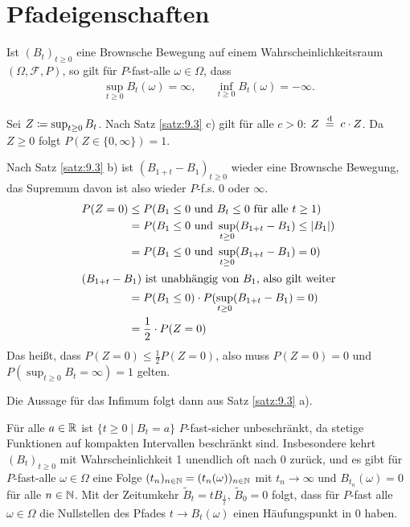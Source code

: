 \documentclass[a4paper,twoside,DIV15,BCOR12mm]{scrbook}
\newcommand{\cF}{\mathcal F}
\begin{document}
\section{Pfadeigenschaften}

\begin{satz}
\label{satz:11.1}
Ist $(B_t)_{t\ge 0}$ eine Brownsche Bewegung auf einem Wahrscheinlichkeitsraum $(\Omega, \cF, P)$, so gilt für $P$-fast-alle $\omega\in \Omega$, dass 
\begin{align*}
\sup_{t\ge 0} B_t(\omega) = \infty, &&\inf_{t\ge 0}B_t(\omega)=-\infty.
\end{align*}
\end{satz}
\begin{beweis}
Sei $Z\da \sup_{t\ge 0}B_t$. Nach Satz \ref{satz:9.3} c) gilt für alle $c>0$:
$Z\gleichnach{d} c\cdot Z$. Da $Z\ge 0$ folgt $P(Z \in \{0,\infty\})=1$.

Nach Satz \ref{satz:9.3} b) ist $(B_{1+t}-B_1)_{t\ge 0}$ wieder eine Brownsche Bewegung, das Supremum davon ist also wieder $P$-f.s. $0$ oder $\infty$.
\begin{align*}
P(Z=0) &\le P(B_1\le 0\text{ und }B_t\le 0\text{ für alle } t\ge 1) \\
&=P(B_1\le 0 \text{ und } \sup_{t\ge 0}(B_{1+t}-B_1) \le |B_1|) \\
&= P(B_1 \le 0 \text{ und } \sup_{t\ge 0}(B_{1+t}-B_1) = 0) \\
\intertext{$(B_{1+t}-B_1)$ ist unabhängig von $B_1$, also gilt weiter}
&= P(B_1\le 0)\cdot P(\sup_{t\ge 0}(B_{1+t}-B_1) = 0) \\
&= \frac12 \cdot P(Z=0)
\end{align*}
Das heißt, dass $P(Z=0)\le \frac 12 P(Z=0)$, also muss $P(Z=0)=0$ und $P(\sup_{t\ge 0}B_t =\infty) = 1$ gelten.

Die Aussage für das Infimum folgt dann aus Satz \ref{satz:9.3} a).
\end{beweis}


\begin{bemerkung}
Für alle $a\in \mathbb{R}$ ist $\{t\ge 0\mid B_t=a\}$ $P$-fast-sicher unbeschränkt, da stetige Funktionen auf kompakten Intervallen beschränkt sind. Insbesondere kehrt $(B_t)_{t\ge 0}$ mit Wahrscheinlichkeit 1 unendlich oft nach 0 zurück, und es gibt für $P$-fast-alle $\omega\in\Omega$ eine Folge $(t_n)_{n\in \mathbb{N}}  = (t_n(\omega))_{n\in\mathbb{N}}$ mit $t_n\to \infty$ und $B_{t_n}(\omega)=0$ für alle $n\in\mathbb{N}$. Mit der Zeitumkehr $\tilde B_t=tB_{\frac 1t}$, $\tilde B_0=0$ folgt, dass für $P$-fast alle $\omega\in \Omega$ die Nullstellen des Pfades $t\to B_t(\omega)$ einen Häufungspunkt in $0$ haben.
\end{bemerkung}
\end{document}
